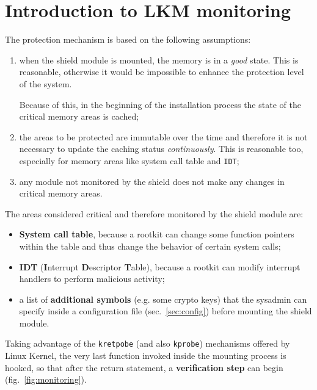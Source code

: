 \documentclass{article}
\begin{document}
	\section{Introduction to LKM monitoring}
	The protection mechanism is based on the following assumptions:
	\begin{enumerate}
		\item when the shield module is mounted, the memory is in a \textit{good} state. This is reasonable, otherwise
		it would be impossible to enhance the protection level of the system.

		Because of this, in the beginning of the installation process the state of the critical memory areas is cached;

		\item the areas to be protected are immutable over the time and therefore it is not necessary to update the
		caching status \textit{continuously}. This is reasonable too, especially for memory areas like system call
		table and \texttt{IDT};

		\item any module not monitored by the shield does not make any changes in critical memory areas.
	\end{enumerate}


	The areas considered critical and therefore monitored by the shield module are:
	\begin{itemize}
		\item \textbf{System call table}, because a rootkit can change some function pointers within the table and thus
		change the behavior of certain system calls;
		\item \textbf{IDT} (\textbf{I}nterrupt \textbf{D}escriptor \textbf{T}able), because a rootkit can modify
		interrupt handlers to perform malicious activity;
		\item a list of \textbf{additional symbols} (e.g. some crypto keys) that the sysadmin can specify inside a
		configuration file (sec.~\ref{sec:config}) before mounting the shield module.
	\end{itemize}

	Taking advantage of the \texttt{kretpobe} (and also \texttt{kprobe}) mechanisms offered by Linux
	Kernel, the very last function invoked inside the mounting process is hooked, so
	that after the return statement, a \textbf{verification step} can begin (fig.~\ref{fig:monitoring}).
\end{document}
